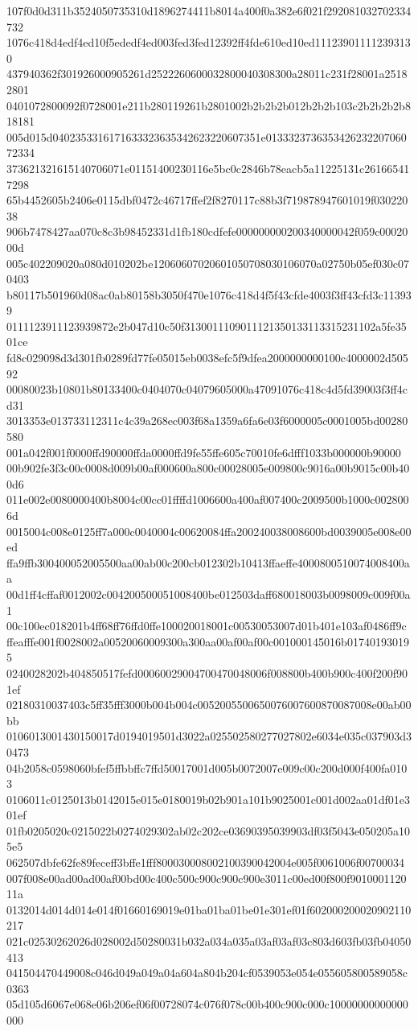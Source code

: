 107f0d0d311b3524050735310d1896274411b8014a400f0a382e6f021f292081032702334732
1076c418d4edf4ed10f5ededf4ed003fed3fed12392ff4fde610ed10ed111239011112393130
437940362f301926000905261d2522260600032800040308300a28011c231f28001a25182801
0401072800092f0728001e211b280119261b2801002b2b2b2b012b2b2b103c2b2b2b2b818181
005d015d0402353316171633323635342623220607351e013332373635342623220706072334
373621321615140706071e01151400230116e5bc0c2846b78eacb5a11225131c261665417298
65b4452605b2406e0115dbf0472c46717ffef2f8270117c88b3f719878947601019f03022038
906b7478427aa070c8c3b98452331d1fb180cdfefe000000000200340000042f059c0002000d
005c402209020a080d010202be12060607020601050708030106070a02750b05ef030c070403
b80117b501960d08ac0ab80158b3050f470e1076c418d4f5f43cfde4003f3ff43cfd3c113939
0111123911123939872e2b047d10c50f3130011109011121350133113315231102a5fe3501ce
fd8c029098d3d301fb0289fd77fe05015eb0038efc5f9dfea2000000000100c4000002d50592
00080023b10801b80133400c0404070c04079605000a47091076c418c4d5fd39003f3ff4cd31
3013353e013733112311c4c39a268ec003f68a1359a6fa6e03f6000005c0001005bd00280580
001a042f001f0000ffd90000ffda0000ffd9fe55ffe605c70010fe6dfff1033b000000b90000
00b902fe3f3c00c0008d009b00af000600a800c00028005e009800c9016a00b9015c00b400d6
011e002e0080000400b8004c00cc01ffffd1006600a400af007400c2009500b1000c0028006d
0015004c008e0125ff7a000c0040004c00620084ffa200240038008600bd0039005e008e00ed
ffa9ffb300400052005500aa00ab00c200cb012302b10413ffaeffe4000800510074008400aa
00d1ff4cffaf0012002c004200500051008400be012503daff680018003b0098009c009f00a1
00c100ec018201b4ff68ff76ffd0ffe100020018001c00530053007d01b401e103af0486ff9c
ffeafffe001f0028002a00520060009300a300aa00af00af00c001000145016b017401930195
0240028202b404850517fefd00060029004700470048006f008800b400b900c400f200f901ef
02180310037403c5ff35fff3000b004b004c0052005500650076007600870087008e00ab00bb
0106013001430150017d0194019501d3022a025502580277027802e6034e035c037903d30473
04b2058c0598060bfef5ffbbffc7ffd50017001d005b0072007e009c00c200d000f400fa0103
0106011c0125013b0142015e015e0180019b02b901a101b9025001c001d002aa01df01e301ef
01fb0205020c0215022b0274029302ab02c202ce03690395039903df03f5043e050205a105e5
062507dbfe62fe89feceff3bffe1fff800030008002100390042004e005f0061006f00700034
007f008e00ad00ad00af00bd00c400c500c900c900c900e3011c00ed00f800f901000112011a
0132014d014d014e014f01660169019e01ba01ba01be01e301ef01f602000200020902110217
021c02530262026d028002d50280031b032a034a035a03af03af03c803d603fb03fb04050413
041504470449008c046d049a049a04a604a804b204cf0539053e054e055605800589058c0363
05d105d6067e068e06b206ef06f00728074c076f078c00b400c900c000c10000000000000000
